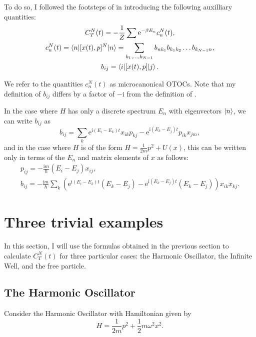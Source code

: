 \documentclass{article}
\newcommand{\e}{\mathrm{e}}
\newcommand{\I}{\mathrm{i}}
\begin{document}
To do so, I followed the footsteps of \cite{Hashimoto_2017} in introducing the following auxilliary quantities:
\begin{gather}
C_T^N(t) = -\frac1Z \sum \e^{-\beta E_n} c_n^N(t),\label{bigcdef}\\
c_n^N(t) = \braket{n|[x(t), p]^N|n} = \sum_{k_1, \dots, k_{N-1}} b_{nk_1} b_{k_1 k_2} \dots b_{k_{N-1} n}, \label{smallcdef}\\
b_{ij} = \braket{i|[x(t), p]|j}. \label{bdef}
\end{gather}

We refer to the quantities $c_n^N(t)$ as microcanonical OTOCs. Note that my definition of $b_{ij}$ differs by a factor of $-\I$ from the definition of \cite{Hashimoto_2017}.

In the case where $H$ has only a discrete spectrum $E_n$ with eigenvectors $\ket n$, we can write $b_{ij}$ as
\[b_{ij} = \sum_k \e^{\I (E_i - E_k) t} x_{ik} p_{kj} - \e^{\I (E_k - E_j) t} p_{ik} x_{jm},\]
and in the case where $H$ is of the form $H = \frac1{2m} p^2 + U(x)$, this can be written only in terms of the $E_n$ and matrix elements of $x$ as follows:
\begin{gather}
p_{ij} = - \frac{\I m}{\hbar} (E_i - E_j) x_{ij},\\
b_{ij} = - \frac{\I m}{\hbar} \sum_k \left( \e^{\I (E_i - E_k) t} (E_k - E_j) - \e^{\I (E_k - E_j) t} (E_k - E_j) \right) x_{ik} x_{kj}. \label{bijwithx}
\end{gather}

\section{Three trivial examples}

In this section, I will use the formulas obtained in the previous section to calculate $C_T^N(t)$ for three particular cases: the Harmonic Oscillator, the Infinite Well, and the free particle.

\subsection{The Harmonic Oscillator}

Consider the Harmonic Oscillator with Hamiltonian given by
\begin{equation}
H = \frac1{2m} p^2 + \frac12 m \omega^2 x^2.
\end{equation}
\end{document}
